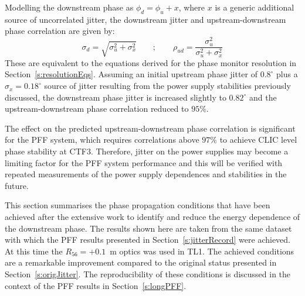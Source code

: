 Modelling the downstream phase as \(\phi_d = \phi_u + x\), where \(x\) is a generic additional source of uncorrelated jitter, the downstream jitter and upstream-downstream phase correlation are given by:
\begin{equation}
\sigma_d = \sqrt{\sigma_u^2 + \sigma_x^2}
\qquad\mathrm{;}\qquad
\rho_{ud} = \frac{\sigma_u^2}{\sigma_u^2 + \sigma_x^2}
\end{equation}
These are equivalent to the equations derived for the phase monitor resolution in Section~\ref{s:resolutionEqs}. Assuming an initial upstream phase jitter of \(0.8^\circ\) plus a \(\sigma_x = 0.18^\circ\) source of jitter resulting from the power supply stabilities previously discussed, the downstream phase jitter is increased slightly to \(0.82^\circ\) and the upstream-downstream phase correlation reduced to \(95\%\).

The effect on the predicted upstream-downstream phase correlation is significant for the PFF system, which requires correlations above \(97\%\) to achieve CLIC level phase stability at CTF3. Therefore, jitter on the power supplies may become a limiting factor for the PFF system performance and this will be verified with repeated measurements of the power supply dependences and stabilities in the future.



This section summarises the phase propagation conditions that have been achieved after the extensive work to identify and reduce the energy dependence of the downstream phase. The results shown here are taken from the same dataset with which the PFF results presented in Section~\ref{s:jitterRecord} were achieved. At this time the \(R_{56} = +0.1\)~m optics was used in TL1. The achieved conditions are a remarkable improvement compared to the original status presented in Section~\ref{s:origJitter}. The reproducibility of these conditions is discussed in the context of the PFF results in Section~\ref{s:longPFF}.

